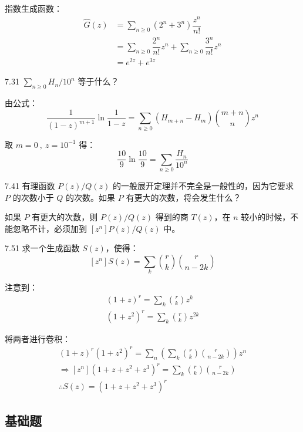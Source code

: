 指数生成函数：
\begin{align*}
  \hat{G}(z) &= \sum_{n \geqslant 0} (2^n + 3^n) \dfrac{z^n}{n!} \\
  &= \sum_{n \geqslant 0} \dfrac{2^n}{n!} z^n + \sum_{n \geqslant 0} \dfrac{3^n}{n!} z^n \\
  &= e^{2z} + e^{3z}
\end{align*}

\begin{problem}{7.3}{1}
  \( \sum_{n \geqslant 0} H_n / 10^n \) 等于什么？
\end{problem}

由公式：
\[
  \boxed{\dfrac{1}{(1-z)^{m+1}} \ln{\dfrac{1}{1-z}} = \sum_{n \geqslant 0} (H_{m+n} - H_m) \binom{m+n}{n} z^n}
\]

取 \( m = 0 \ , \ z = 10^{-1} \) 得：
\[
  \dfrac{10}{9} \ln{\dfrac{10}{9}} = \sum_{n \geqslant 0} \dfrac{H_n}{10^n}
\]

\begin{problem}{7.4}{1}
  有理函数 \( P(z) / Q(z) \) 的一般展开定理并不完全是一般性的，因为它要求 \( P \) 的次数小于 \( Q \) 的次数。如果 \( P \) 有更大的次数，将会发生什么？
\end{problem}

如果 \( P \) 有更大的次数，则 \( P(z)/Q(z) \) 得到的商 \( T(z) \)，在 \( n \) 较小的时候，不能忽略不计，必须加到 \( [z^n] P(z) / Q(z) \) 中。

\begin{problem}{7.5}{1}
  求一个生成函数 \( S(z) \)，使得：
  \[
    [z^n] S(z) = \sum_k \binom{r}{k} \binom{r}{n-2k}
  \]
\end{problem}

注意到：
\begin{gather*}
  (1+z)^r = \sum_k \binom{r}{k} z^k \\
  (1+z^2)^{r} = \sum_k \binom{r}{k} z^{2k}
\end{gather*}

将两者进行卷积：
\begin{gather*}
  (1+z)^r (1+z^2)^r = \sum_n \left( \sum_k \binom{r}{k} \binom{r}{n-2k} \right) z^n \\
  \Rightarrow [z^n] (1+z+z^2+z^3)^r = \sum_k \binom{r}{k} \binom{r}{n-2k} \\
  \therefore S(z) = (1+z+z^2+z^3)^r
\end{gather*}

\subsection{基础题}

